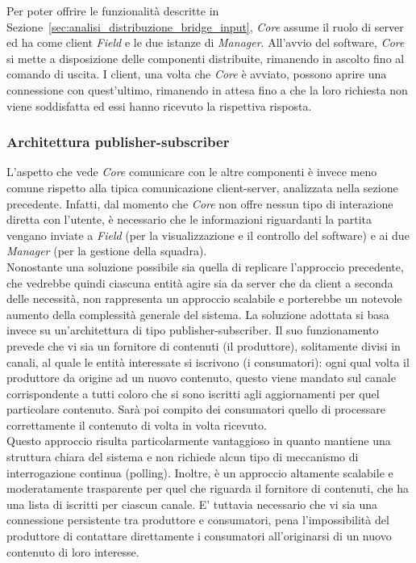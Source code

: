 Per poter offrire le funzionalità descritte in Sezione~\ref{sec:analisi_distribuzione_bridge_input}, \textit{Core} assume il ruolo di server ed ha come client \textit{Field} e le due istanze di \textit{Manager}. All'avvio del software, \textit{Core} si mette a disposizione delle componenti distribuite, rimanendo in ascolto fino al comando di uscita. I client, una volta che \textit{Core} è avviato, possono aprire una connessione con quest'ultimo, rimanendo in attesa fino a che la loro richiesta non viene soddisfatta ed essi hanno ricevuto la rispettiva risposta.

\subsubsection{Architettura publisher-subscriber}
\label{sec:analisi_client_pusblisher_subscriber}

L'aspetto che vede \textit{Core} comunicare con le altre componenti è invece meno comune rispetto alla tipica comunicazione client-server, analizzata nella sezione precedente. Infatti, dal momento che \textit{Core} non offre nessun tipo di interazione diretta con l'utente, è necessario che le informazioni riguardanti la partita vengano inviate a \textit{Field} (per la visualizzazione e il controllo del software) e ai due \textit{Manager} (per la gestione della squadra).\\

Nonostante una soluzione possibile sia quella di replicare l'approccio precedente, che vedrebbe quindi ciascuna entità agire sia da server che da client a seconda delle necessità, non rappresenta un approccio scalabile e porterebbe un notevole aumento della complessità generale del sistema. La soluzione adottata si basa invece su un'architettura di tipo publisher-subscriber. Il suo funzionamento prevede che vi sia un fornitore di contenuti (il produttore), solitamente divisi in canali, al quale le entità interessate si iscrivono (i consumatori): ogni qual volta il produttore da origine ad un nuovo contenuto, questo viene mandato sul canale corrispondente a tutti coloro che si sono iscritti agli aggiornamenti per quel particolare contenuto. Sarà poi compito dei consumatori quello di processare correttamente il contenuto di volta in volta ricevuto.\\

Questo approccio risulta particolarmente vantaggioso in quanto mantiene una struttura chiara del sistema e non richiede alcun tipo di meccanismo di interrogazione continua (polling). Inoltre, è un approccio altamente scalabile e moderatamente trasparente per quel che riguarda il fornitore di contenuti, che ha una lista di iscritti per ciascun canale. E' tuttavia necessario che vi sia una connessione persistente tra produttore e consumatori, pena l'impossibilità del produttore di contattare direttamente i consumatori all'originarsi di un nuovo contenuto di loro interesse.
